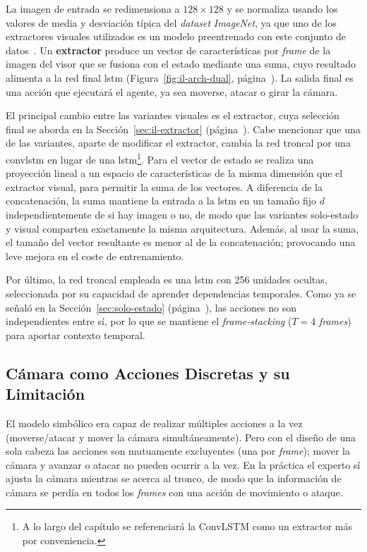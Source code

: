 La imagen de entrada se redimensiona a $\num{128}\times\num{128}$ y se normaliza usando
los valores de media y desviación típica del \textit{dataset} \textit{ImageNet}, ya que uno de los
extractores visuales utilizados es un modelo preentrenado con este conjunto de datos~\cite{DBLP:conf/cvpr/DengDSLL009}.
Un \textbf{extractor} produce un vector de características por \textit{frame} de la imagen del visor que se
fusiona con el estado mediante una suma, cuyo resultado alimenta a la red final
\gls{lstm} (Figura~\ref{fig:il-arch-dual}, página~\pageref{fig:il-arch-dual}).
La salida final es una acción que ejecutará el agente, ya sea moverse, atacar o girar la cámara.

El principal cambio entre las variantes visuales es el extractor, cuya selección final se aborda
en la Sección~\ref{sec:il-extractor} (página~\pageref{sec:il-extractor}). 
Cabe mencionar que una de las variantes, aparte de modificar el extractor,
cambia la red troncal por una \gls{convlstm} en lugar de una \gls{lstm}\footnote{A lo largo del
capítulo se referenciará la ConvLSTM como un extractor más por conveniencia.}.
Para el vector de estado se realiza una proyección lineal a un espacio de características de la misma dimensión que el 
extractor visual, para permitir la suma de los vectores.
A diferencia de la concatenación, la suma mantiene la entrada a la \gls{lstm} en un tamaño fijo $d$
independientemente de si hay imagen o no, de modo que las variantes solo-estado y
visual comparten exactamente la misma arquitectura. Además, al usar la suma, el tamaño del vector resultante 
es menor al de la concatenación; provocando una leve mejora en el coste de entrenamiento. 

Por último, la red troncal empleada es una \gls{lstm} con \num{256} unidades ocultas,
seleccionada por su capacidad de aprender dependencias temporales. Como ya se señaló en la
Sección~\ref{sec:solo-estado} (página~\pageref{sec:solo-estado}), las acciones no son independientes entre sí, por lo que se
mantiene el \textit{\gls{frame-stacking}} ($T=\num{4}$ \textit{frames}) para aportar contexto temporal.


\subsection{Cámara como Acciones Discretas y su Limitación}
\label{sec:il-camara-discreta}
El modelo simbólico era capaz de realizar múltiples acciones a la vez
(moverse/atacar y mover la cámara simultáneamente).
Pero con el diseño de una sola cabeza las acciones son mutuamente excluyentes (una por \textit{frame});
mover la cámara y avanzar o atacar no
pueden ocurrir a la vez. En la práctica el experto sí ajusta la cámara mientras se
acerca al tronco, de modo que la información de cámara se perdía en todos los
\textit{frames} con una acción de movimiento o ataque.

